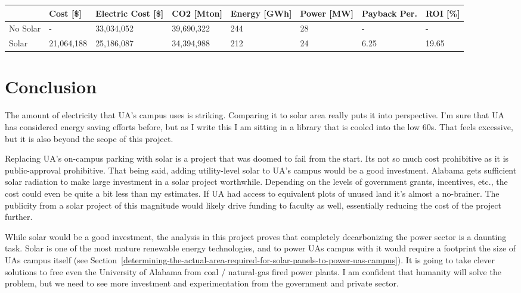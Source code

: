\documentclass[11pt]{article}
\begin{document}
{\footnotesize
\begin{tabular}{llllllll}
\toprule
{} &    Cost [\$] & Electric Cost [\$] & CO2 [Mton] & Energy [GWh] & Power [MW] & Payback Per. &    ROI [\%] \\
\midrule
No Solar &           - &               33,034,052 &        39,690,322 &                          244 &                         28 &              - &          - \\
Solar    &  21,064,188 &               25,186,087 &        34,394,988 &                          212 &                         24 &           6.25 &  19.65 \\
\bottomrule
\end{tabular}
}

        
\hypertarget{conclusion}{%
\section{Conclusion}\label{conclusion}}

The amount of electricity that UA's campus uses is striking. Comparing it to solar area really puts it into perspective. I'm sure that UA has considered energy saving efforts before, but as I write this I am sitting in a library that is cooled into the low 60s. That feels excessive, but it is also beyond the scope of this project.

Replacing UA's on-campus parking with solar is a project that was doomed to fail from the start. Its not so much cost prohibitive as it is public-approval prohibitive. That being said, adding utility-level solar to UA's campus would be a good investment. Alabama gets sufficient solar radiation to make large investment in a solar project worthwhile. Depending on the levels of government grants, incentives, etc., the cost could even be quite a bit less than my estimates. If UA had access to equivalent plots of unused land it's almost a no-brainer. The publicity from a solar project of this magnitude would likely drive funding to faculty as well, essentially reducing the cost of the project further.

While solar would be a good investment, the analysis in this project proves that completely decarbonizing the power sector is a daunting task. Solar is one of the most mature renewable energy technologies, and to power UAs campus with it would require a footprint the size of UAs campus itself (see Section~\ref{determining-the-actual-area-required-for-solar-panels-to-power-uas-campus}). It is going to take clever solutions to free even the University of Alabama from coal / natural-gas fired power plants. I am confident that humanity will solve the problem, but we need to see more investment and experimentation from the government and private sector.

\newpage


    
\end{document}
